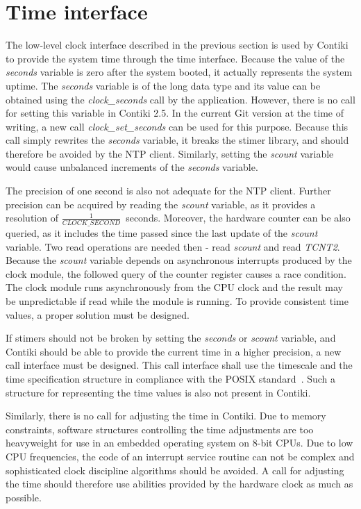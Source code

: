 
\section{Time interface}\label{sec:analysis-time}
The low-level clock interface described in the previous section
is used by Contiki to provide the system time through the time interface.
Because the value of the {\it{seconds}} variable is zero after the system booted,
it actually represents the system uptime.
The {\it{seconds}} variable is of the long data type and its
value can be obtained using the {\it{clock\_seconds}} call by the application.
However, there is no call for setting this variable in Contiki 2.5.
In the current Git version at the time of writing, a new call {\it{clock\_set\_seconds}}
can be used for this purpose.
Because this call simply rewrites the {\it{seconds}} variable, it breaks the stimer library,
and should therefore be avoided by the NTP client.
Similarly, setting the {\it{scount}} variable would cause
unbalanced increments of the {\it{seconds}} variable.

The precision of one second is also not adequate for the NTP client.
Further precision can be acquired by reading the {\it{scount}} variable,
as it provides a resolution of $\frac{1}{CLOCK\_SECOND}$~seconds.
Moreover, the hardware counter can be also queried, as it includes the time passed since
the last update of the {\it{scount}} variable.
Two read operations are needed then - read {\it{scount}} and read {\it{TCNT2}}.
Because the {\it{scount}} variable depends on asynchronous interrupts produced by
the clock module, the followed query of the counter register causes a race condition.
The clock module runs asynchronously from the CPU clock and
the result may be unpredictable if read while the module is running.
To provide consistent time values, a proper solution must be designed.

If stimers should not be broken by setting the {\it{seconds}} or {\it{scount}} variable,
and Contiki should be able to provide the current time in a higher precision,
a new call interface must be designed.
This call interface shall use the timescale and the time specification structure in compliance
with the POSIX standard~\cite{posix}.
Such a structure for representing the time values is also not present in Contiki.

Similarly, there is no call for adjusting the time in Contiki.
Due to memory constraints, software structures controlling the time adjustments are too heavyweight
for use in an embedded operating system on 8-bit CPUs.
Due to low CPU frequencies, the code of an interrupt service routine can not be complex
and sophisticated clock discipline algorithms should be avoided.
A call for adjusting the time should therefore use abilities
provided by the hardware clock as much as possible.

